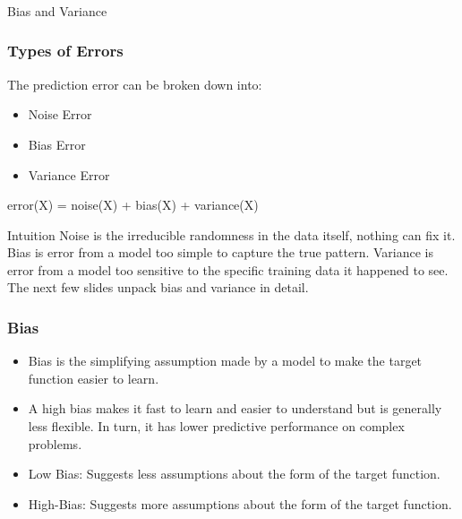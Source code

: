 \begin{frame}[fragile]\frametitle{}
\begin{center}
{\Large Bias and Variance}
\end{center}
\end{frame}



\begin{frame}[fragile]\frametitle{Types of Errors}
The prediction error can be broken down into:
\begin{itemize}
\item Noise Error
\item Bias Error
\item Variance Error
\end{itemize}
error(X) = noise(X) + bias(X) + variance(X)
\begin{block}{Intuition}
Noise is the irreducible randomness in the data itself, nothing can fix it. Bias is error from a model too simple to capture the true pattern. Variance is error from a model too sensitive to the specific training data it happened to see. The next few slides unpack bias and variance in detail.
\end{block}
\end{frame}

\begin{frame}[fragile]\frametitle{Bias}

\begin{itemize}
\item Bias is the simplifying assumption made by a model to make the target function easier to learn.
\item A high bias makes it fast to learn and easier to understand but is generally less flexible.  In turn, it has lower predictive performance on complex problems.
\item 
    Low Bias: Suggests less assumptions about the form of the target function.
    \item
    High-Bias: Suggests more assumptions about the form of the target function.

\end{itemize}
\end{frame}

